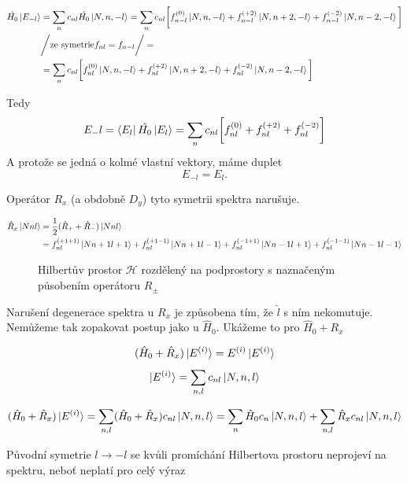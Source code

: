 \documentclass{article}
\begin{document}
\begin{align*}\hat{H_0}\ket{E_{-l}} &= \sum_n c_{nl} \hat{H_0}\ket{N,n,-l}  = 
\sum_n c_{nl}\bigg[  f_{n-l}^{(0)}\ket{N,n,-l} + f_{n-l}^{(+2)}\ket{N,n+2,-l} +f_{n-l}^{(-2)}\ket{N,n-2,-l} \bigg]\\
&\bigg/ \text{ze symetrie} f_{nl} = f_{n-l} \bigg/ = \\
 &=\sum_n c_{nl}\bigg[  f_{nl}^{(0)}\ket{N,n,-l} + f_{nl}^{(+2)}\ket{N,n+2,-l} +f_{nl}^{(-2)}\ket{N,n-2,-l} \bigg]\\
\end{align*}


Tedy 
$$E_-l = \bra{E_l}\hat{H_0}\ket{E_l} = 
\sum_n c_{nl}\bigg[  f_{nl}^{(0)} + f_{nl}^{(+2)} +f_{nl}^{(-2)} \bigg]$$
A protože se jedná o kolmé vlastní vektory, máme duplet
$$E_{-l} = E_{l}.$$



Operátor $R_{x}$ (a obdobně $D_{y}$) tyto symetrii spektra narušuje. 

\begin{align*}
\hat{R}_x\ket{Nnl} &= \frac{1}{2}(\hat{R}_+ + \hat{R}_-)\ket{Nnl} \\
&= f_{nl}^{(+1+1)}\ket{Nn+1l+1}
+ f_{nl}^{(+1-1)}\ket{Nn+1l-1} + f_{nl}^{(-1+1)}\ket{Nn-1l+1} + f_{nl}^{(-1-1)}\ket{Nn-1l-1}
\end{align*}

\begin{figure}[H]
    \centering
    \def\svgwidth{10cm}
     
     \caption*{Hilbertův prostor $\mathcal{H}$ rozdělený na podprostory s naznačeným působením operátoru $R_{\pm}$}    
\end{figure}


Narušení degenerace spektra u $R_{x}$ je způsobena tím, že $\hat{l}$ s ním nekomutuje. Nemůžeme tak zopakovat postup jako u 
$\hat{H}_0$. Ukážeme to pro $\hat{H}_0 + R_{x}$

$$(\hat{H}_0 + \hat{R}_{x})\ket{E^{(i)}} = E^{(i)}\ket{E^{(i)}}$$
$$\ket{E^{(i)}} = \sum_{n,l} c_{nl}\ket{N,n,l}$$

\begin{align*}(\hat{H}_0 + \hat{R}_{x})\ket{E^{(i)}} &=  \sum_{n,l} (\hat{H}_0 + \hat{R}_{x}) c_{nl}\ket{N,n,l} = 
    \sum_{n} \hat{H}_0 c_{n}\ket{N,n,l} + \sum_{n,l}\hat{R}_{x} c_{nl}\ket{N,n,l}\\
    \end{align*}

    Původní symetrie $l \rightarrow -l$ se kvůli promíchání Hilbertova prostoru neprojeví na spektru, neboť neplatí pro celý výraz
\end{document}
